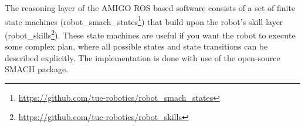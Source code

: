 The reasoning layer of the AMIGO ROS based software consists of a set of finite state machines (robot\_smach\_states\footnote{\url{https://github.com/tue-robotics/robot_smach_states}}) that build upon the robot’s skill layer (robot\_skills\footnote{\url{https://github.com/tue-robotics/robot_skills}}). These state machines are useful if you want the robot to execute some complex plan, where all possible states and state transitions can be described explicitly. The implementation is done with use of the open-source SMACH package. %